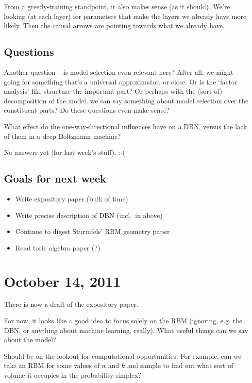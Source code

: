 \documentclass[12pt]{article}
\begin{document}
From a greedy-training standpoint, it also makes sense (as it should).  We're
looking (at each layer) for parameters that make the layers we already have more
likely.  Then the causal arrows are pointing towards what we already have.

\subsection{Questions}

Another question -- is model selection even relevant here?  After all, we might
going for something that's a universal approximator, or close.  Or is the
`factor analysis'-like structure the important part?  Or perhaps with the
(sort-of) decomposition of the model, we can say something about model selection
over the constituent parts?  Do these questions even make sense?

What effect do the one-way-directional influences have on a DBN, versus the lack
of them in a deep Boltzmann machine?

No answers yet (for last week's stuff). :-(


\subsection{Goals for next week}
\begin{itemize}
\item Write expository paper (bulk of time)
\item Write precise description of DBN (incl.\ in above)
\item Continue to digest Sturmfels' RBM geometry paper
\item Read toric algebra paper (?)
\end{itemize}

\section{October 14, 2011}

There is now a draft of the expository paper.

For now, it looks like a good idea to focus solely on the RBM (ignoring, e.g.
the DBN, or anything about machine learning, really).  What useful things can we
say about the model?

Should be on the lookout for computational opportunities.  For example, can we
take an RBM for some values of $n$ and $k$ and sample to find out what sort of
volume it occupies in the probability simplex?  
\end{document}
